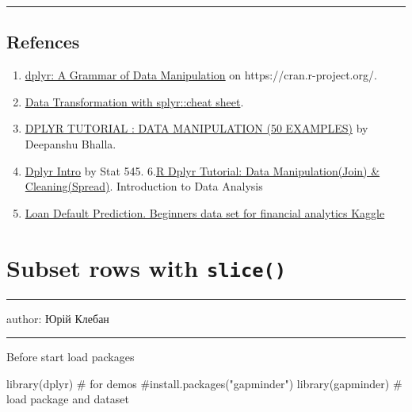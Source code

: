 \documentclass[
  letterpaper,
  DIV=11,
  numbers=noendperiod]{scrreprt}
\newenvironment{Shaded}{\begin{snugshade}}{\end{snugshade}}
\newcommand{\CommentTok}[1]{\textcolor[rgb]{0.37,0.37,0.37}{#1}}
\newcommand{\FunctionTok}[1]{\textcolor[rgb]{0.28,0.35,0.67}{#1}}
\newcommand{\NormalTok}[1]{\textcolor[rgb]{0.00,0.23,0.31}{#1}}
\providecommand{\tightlist}{%
  \setlength{\itemsep}{0pt}\setlength{\parskip}{0pt}}\usepackage{longtable,booktabs,array}
\begin{document}
\begin{center}\rule{0.5\linewidth}{0.5pt}\end{center}

\section{Refences}\label{refences-1}

\begin{enumerate}
\def\labelenumi{\arabic{enumi}.}
\tightlist
\item
  \href{https://cran.r-project.org/web/packages/dplyr/index.html}{dplyr:
  A Grammar of Data Manipulation} on https://cran.r-project.org/.
\item
  \href{https://github.com/rstudio/cheatsheets/blob/master/data-transformation.pdf}{Data
  Transformation with splyr::cheat sheet}.
\item
  \href{https://www.listendata.com/2016/08/dplyr-tutorial.html}{DPLYR
  TUTORIAL : DATA MANIPULATION (50 EXAMPLES)} by Deepanshu Bhalla.
\item
  \href{https://stat545.com/dplyr-intro.html}{Dplyr Intro} by Stat 545.
  6.\href{https://www.guru99.com/r-dplyr-tutorial.html}{R Dplyr
  Tutorial: Data Manipulation(Join) \& Cleaning(Spread)}. Introduction
  to Data Analysis
\item
  \href{https://www.kaggle.com/kmldas/loan-default-prediction}{Loan
  Default Prediction. Beginners data set for financial analytics Kaggle}
\end{enumerate}

\chapter{\texorpdfstring{Subset rows with
\texttt{slice()}}{Subset rows with slice()}}\label{subset-rows-with-slice}

\begin{center}\rule{0.5\linewidth}{0.5pt}\end{center}

author: Юрій Клебан

\begin{center}\rule{0.5\linewidth}{0.5pt}\end{center}

Before start load packages

\begin{Shaded}
\begin{Highlighting}[]
\FunctionTok{library}\NormalTok{(dplyr) }\CommentTok{\# for demos}
\CommentTok{\#install.packages("gapminder")}
\FunctionTok{library}\NormalTok{(gapminder)  }\CommentTok{\# load package and dataset}
\end{Highlighting}
\end{Shaded}
\end{document}
